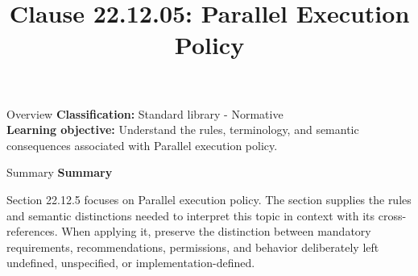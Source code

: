 \documentclass[10pt,letterpaper]{article}
\title{Clause 22.12.05: Parallel Execution Policy}
\author{}
\date{}
\begin{document}
\maketitle
\begin{CornellOverviewBox}{Overview}
\textbf{Classification:} Standard library - Normative\\[2pt]
\textbf{Learning objective:} Understand the rules, terminology, and semantic consequences associated with Parallel execution policy.
\end{CornellOverviewBox}\begin{CornellSummaryBox}{Summary}
{\sffamily\bfseries\color{Accent} Summary}\par\vspace{3pt}Section 22.12.5 focuses on Parallel execution policy. The section supplies the rules and semantic distinctions needed to interpret this topic in context with its cross-references. When applying it, preserve the distinction between mandatory requirements, recommendations, permissions, and behavior deliberately left undefined, unspecified, or implementation-defined.
\end{CornellSummaryBox}
\end{document}
